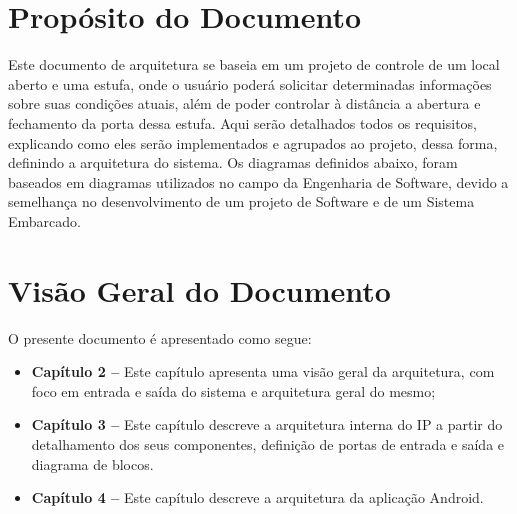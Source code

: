 \documentclass{report}
\begin{document}
  \section{Propósito do Documento}
      Este documento de arquitetura se baseia em um projeto de controle de um local aberto e uma estufa, onde o usuário poderá solicitar determinadas informações sobre 
      suas condições atuais, além de poder controlar à distância a abertura e fechamento da porta dessa estufa. Aqui serão detalhados todos os requisitos, explicando como 
      eles serão implementados e agrupados ao projeto, dessa forma, definindo a arquitetura do sistema. Os diagramas definidos abaixo, foram baseados em diagramas utilizados
      no campo da Engenharia de Software, devido a semelhança no desenvolvimento de um projeto de Software e de um Sistema Embarcado.

\section{Visão Geral do Documento}
O presente documento é apresentado como segue:
  \begin{itemize}
   \item \textbf{Capítulo 2 --} Este capítulo apresenta uma visão geral da arquitetura, com foco em entrada e saída do sistema e arquitetura geral do mesmo;
   \item \textbf{Capítulo 3 --} Este capítulo descreve a arquitetura interna do IP a partir do detalhamento dos seus componentes, definição de portas de entrada e saída e diagrama de blocos. 
   \item \textbf{Capítulo 4 --} Este capítulo descreve a arquitetura da aplicação Android. 
  \end{itemize}


\end{document}
